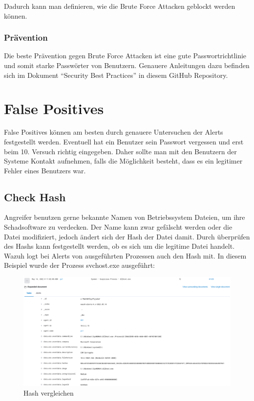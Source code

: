Dadurch kann man definieren, wie die Brute Force Attacken geblockt werden können.

\subsubsection{Prävention}
Die beste Prävention gegen Brute Force Attacken ist eine gute Passwortrichtlinie und somit starke Passwörter von Benutzern.
Genauere Anleitungen dazu befinden sich im Dokument ``Security Best Practices'' in diesem GitHub Repository.

\section{False Positives}
False Positives können am besten durch genauere Untersuchen der Alerts festgestellt werden.
Eventuell hat ein Benutzer sein Passwort vergessen und erst beim 10. Versuch richtig eingegeben. 
Daher sollte man mit den Benutzern der Systeme Kontakt aufnehmen, falls die Möglichkeit besteht, dass es ein legitimer Fehler eines Benutzers war.  

\subsection{Check Hash}
Angreifer benutzen gerne bekannte Namen von Betriebssystem Dateien, um ihre Schadsoftware zu verdecken.
Der Name kann zwar gefälscht werden oder die Datei modifiziert, jedoch ändert sich der Hash der Datei damit.
Durch überprüfen des Hashs kann festgestellt werden, ob es sich um die legitime Datei handelt. \\

Wazuh logt bei Alerts von ausgeführten Prozessen auch den Hash mit.
In diesem Beispiel wurde der Prozess svchost.exe ausgeführt:
\begin{figure}[H]
    \centering
    \includegraphics[width=\linewidth]{../img/check-hash-1.png}
    \caption{Hash vergleichen}
\end{figure}

